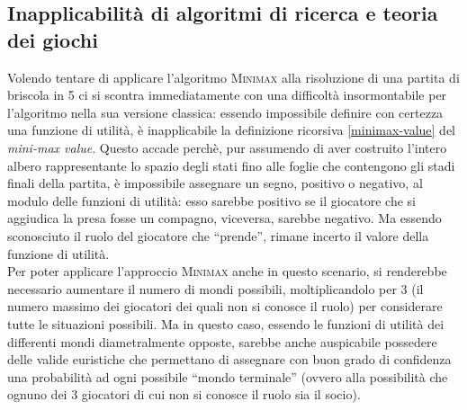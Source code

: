 \subsection{Inapplicabilità di algoritmi di ricerca e teoria dei giochi}
Volendo tentare di applicare l'algoritmo \textsc{Minimax} alla risoluzione di una partita di briscola in 5 ci si scontra immediatamente con una difficoltà insormontabile per l'algoritmo nella sua versione classica: essendo impossibile definire con certezza una funzione di utilità, è inapplicabile la definizione ricorsiva \ref{minimax-value} del \emph{mini-max value}.
Questo accade perchè, pur assumendo di aver costruito l'intero albero rappresentante lo spazio degli stati fino alle foglie che contengono gli stadi finali della partita, è impossibile assegnare un segno, positivo o negativo, al modulo delle funzioni di utilità: esso sarebbe positivo se il giocatore che si aggiudica la presa fosse un compagno, viceversa, sarebbe negativo.
Ma essendo sconosciuto il ruolo del giocatore che ``prende'', rimane incerto il valore della funzione di utilità.\\
Per poter applicare l'approccio \textsc{Minimax} anche in questo scenario, si renderebbe necessario aumentare il numero di mondi possibili, moltiplicandolo per 3 (il numero massimo dei giocatori dei quali non si conosce il ruolo) per considerare tutte le situazioni possibili.
Ma in questo caso, essendo le funzioni di utilità dei differenti mondi diametralmente opposte, sarebbe anche auspicabile possedere delle valide euristiche che permettano di assegnare con buon grado di confidenza una probabilità ad ogni possibile ``mondo terminale'' (ovvero alla possibilità che ognuno dei 3 giocatori di cui non si conosce il ruolo sia il socio).


